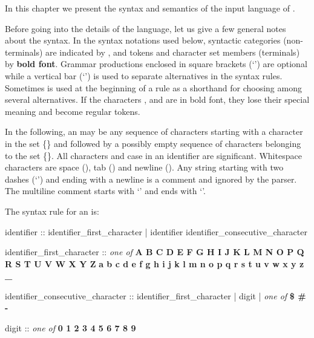 
In this chapter we present the syntax and semantics of the input
language of \nusmv.

Before going into the details of the language, let us give a few general
notes about the syntax.
%
In the syntax notations used below, syntactic categories
(non-terminals) are indicated by , and tokens
and character set members (terminals) by \textbf{bold font}.
%
Grammar productions enclosed in square brackets (`\grammar{[]}') are
optional while a vertical bar (`\grammar{|}') is used to separate
alternatives in the syntax rules. Sometimes  is used
at the beginning of a rule as a shorthand for choosing among several
alternatives.
%
If the characters \grammar{\textbf{|}}, \grammar{\textbf{[}} and
\grammar{\textbf{]}} are in bold font, they lose their special
meaning and become regular tokens.

In the following, an  may be any sequence of
characters starting with a character in the set
\{{}\}
%
and followed by a possibly empty sequence of characters belonging to
the set
%
\{{}\}.
%
All characters and case in an identifier are significant. Whitespace
characters are space (\spc), tab (\tab) and newline (\ret).
%
Any string  starting with two
dashes (`\code{--}') and ending with a newline is a comment and
ignored by the parser. The multiline comment starts with `\code{/--}'
and ends with `\code{--/}'.

The syntax rule for an  is:

\begin{Grammar}
identifier ::
        identifier_first_character
      | identifier identifier_consecutive_character

identifier_first_character :: \emph{one of}
        \textbf{A B C D E F G H I J K L M N O P Q R S T U V W X Y Z}
        \textbf{a b c d e f g h i j k l m n o p q r s t u v w x y z _}

identifier_consecutive_character ::
        identifier_first_character
      | digit
      | \emph{one of} \textbf{\$ \# -}

digit :: \emph{one of} \textbf{0 1 2 3 4 5 6 7 8 9}
\end{Grammar}

